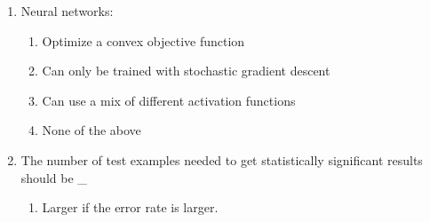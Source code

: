 \documentclass[{\csname fa0013Font0\endcsname\char"0030}{\csname fa0014Font0\endcsname\char"0033}pt]{article}
\begin{document}
\begin{enumerate}[label=\arabic*.]
\begin{enumerate}[label=(\alph*)]
    \item one-class {\csname fa0018Font0\endcsname\char"0063}{\csname fa0018Font1\endcsname\char"006C}{\csname fa0018Font2\endcsname\char"0061}{\csname fa0018Font3\endcsname\char"0073}{\csname fa0018Font4\endcsname\char"0073}{\csname fa0018Font5\endcsname\char"0069}{\csname fa0018Font6\endcsname\char"0066}{\csname fa0018Font7\endcsname\char"0069}{\csname fa0018Font8\endcsname\char"0063}{\csname fa0018Font9\endcsname\char"0061}{\csname fa0018Font10\endcsname\char"0074}{\csname fa0018Font11\endcsname\char"0069}{\csname fa0018Font12\endcsname\char"006F}{\csname fa0018Font13\endcsname\char"006E}
    \item train-test {\csname fa0019Font0\endcsname\char"0061}{\csname fa0019Font1\endcsname\char"006C}{\csname fa0019Font2\endcsname\char"0069}{\csname fa0019Font3\endcsname\char"0067}{\csname fa0019Font4\endcsname\char"006E}{\csname fa0019Font5\endcsname\char"006D}{\csname fa0019Font6\endcsname\char"0065}{\csname fa0019Font7\endcsname\char"006E}{\csname fa0019Font8\endcsname\char"0074} robustness
    \item background {\csname fa0020Font0\endcsname\char"0063}{\csname fa0020Font1\endcsname\char"006C}{\csname fa0020Font2\endcsname\char"0061}{\csname fa0020Font3\endcsname\char"0073}{\csname fa0020Font4\endcsname\char"0073}{\csname fa0020Font5\endcsname\char"0069}{\csname fa0020Font6\endcsname\char"0066}{\csname fa0020Font7\endcsname\char"0069}{\csname fa0020Font8\endcsname\char"0063}{\csname fa0020Font9\endcsname\char"0061}{\csname fa0020Font10\endcsname\char"0074}{\csname fa0020Font11\endcsname\char"0069}{\csname fa0020Font12\endcsname\char"006F}{\csname fa0020Font13\endcsname\char"006E}
\end{enumerate}
\item Neural networks:
\begin{enumerate}[label=(\alph*)]
    \item Optimize a convex objective function
    \item Can only be trained with stochastic gradient descent
    \item Can use a mix of different activation functions
    \item None of the above
\end{enumerate}
\item The number of test examples needed to get statistically significant results should be \_
\begin{enumerate}[label=(\alph*)]
    \item Larger if the error rate is larger.

\end{enumerate}
\end{enumerate}
\end{document}
